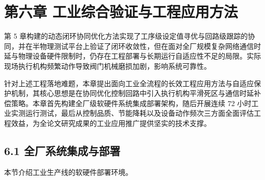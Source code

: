 \documentclass{ctexbook}
\begin{document}
\chapter{第六章 工业综合验证与工程应用方法}
第 5 章构建的动态闭环协同优化方法实现了工序级设定值寻优与回路级跟踪的协同，并在半物理测试平台上验证了闭环收敛性，但在面对全厂规模复杂网络通信时延与物理设备硬件限制时，仍存在工程部署与长期运行自适应性不足的局限。实际现场执行机构频繁动作导致阀门机械磨损加剧，影响系统可靠性。

针对上述工程落地难题，本章提出面向工业全流程的长效工程应用方法与自适应保护机制，其核心思想是在协同优化控制回路中引入执行机构平滑死区与通信时延补偿策略。本章首先构建全厂级软硬件系统集成部署架构，随后开展连续 72 小时工业实测运行测试，最后从控制品质、节能降耗以及设备动作频次三方面全面评估工程效益，为全论文研究成果的工业应用推广提供坚实的技术支撑。

\section{6.1 全厂系统集成与部署}
本节介绍工业生产线的软硬件部署环境。
\end{document}
